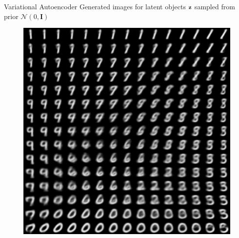 \documentclass{beamer}
\begin{document}
\begin{frame}{Variational Autoencoder}
	Generated images for latent objects $\mathbf{z}$ sampled from prior $\mathcal{N}(0, \mathbf{I})$
	\begin{figure}[h]
		\centering
		\includegraphics[width=.5\linewidth]{figs/vae_0.png}
	\end{figure}
\end{frame}
\end{document}
